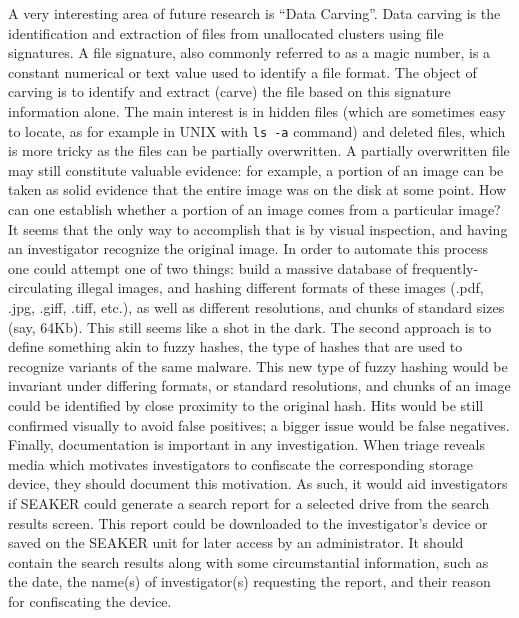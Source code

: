 \documentclass[12pt]{article}
\begin{document}
A very interesting area of future research is ``Data Carving''. Data carving is the identification and extraction
of files from unallocated clusters using file signatures. A file signature, also commonly referred to as a
magic number, is a constant numerical or text value used to identify a file format. The object of carving
is to identify and extract (carve) the file based on this signature information alone. The main interest is in
hidden files (which are sometimes easy to locate, as for example in UNIX with \verb|ls -a| command) and
deleted files, which is more tricky as the files can be partially overwritten. A partially overwritten file may
still constitute valuable evidence: for example, a portion of an image can be taken as solid evidence that
the entire image was on the disk at some point. How can one establish whether a portion of an image
comes from a particular image? It seems that the only way to accomplish that is by visual inspection,
and having an investigator recognize the original image. In order to automate this process one could
attempt one of two things: build a massive database of frequently-circulating illegal images, and
hashing different formats of these images (.pdf, .jpg, .giff, .tiff, etc.), as well as different resolutions,
and chunks of standard sizes (say, 64Kb). This still seems like a shot in the dark. The second approach
is to define something akin to fuzzy hashes, the type of hashes that are used to recognize variants of the
same malware. This new type of fuzzy hashing would be invariant under differing formats, or standard
resolutions, and chunks of an image could be identified by close proximity to the original hash. Hits
would be still confirmed visually to avoid false positives; a bigger issue would be false negatives.\\

Finally, documentation is important in any investigation. When triage reveals media which motivates
investigators to confiscate the corresponding storage device, they should document this motivation. As
such, it would aid investigators if SEAKER could generate a search report for a selected drive from
the search results screen. This report could be downloaded to the investigator’s device or saved on the
SEAKER unit for later access by an administrator. It should contain the search results along with some
circumstantial information, such as the date, the name(s) of investigator(s) requesting the report, and
their reason for confiscating the device.\\
\end{document}
